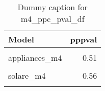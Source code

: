 \begin{table}
\centering
\caption{Dummy caption for m4_ppc_pval_df}
\centering
\fontsize{10}{12}\selectfont
\begin{tabular}[t]{lr}
\toprule
Model & pppval\\
\midrule
\cellcolor{gray!10}{windows\_m4} & \cellcolor{gray!10}{0.45}\\
appliances\_m4 & 0.51\\
\cellcolor{gray!10}{insulation\_m4} & \cellcolor{gray!10}{0.51}\\
solare\_m4 & 0.56\\
\cellcolor{gray!10}{heatpumps\_m4} & \cellcolor{gray!10}{0.49}\\
\bottomrule
\end{tabular}
\end{table}
